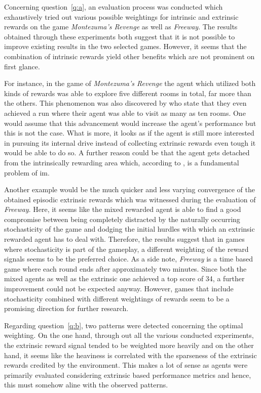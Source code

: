 \documentclass[draft,final]{vutinfth} %
\begin{document}
    Concerning question~\ref{q:a}, an evaluation process was conducted which exhaustively tried out various possible weightings for intrinsic and extrinsic rewards on the game \textit{Montezuma's Revenge} as well as \textit{Freeway}.
    The results obtained through these experiments both suggest that it is not possible to improve existing results in the two selected games.
    However, it seems that the combination of intrinsic rewards yield other benefits which are not prominent on first glance.

    For instance, in the game of \textit{Montezuma's Revenge} the agent which utilized both kinds of rewards was able to explore five different rooms in total, far more than the others.
    This phenomenon was also discovered by \citeauthor{burda_large-scale_2018-1} who state that they even achieved a run where their agent was able to visit as many as ten rooms.
    One would assume that this advancement would increase the agent's performance but this is not the case.
    What is more, it looks as if the agent is still more interested in pursuing its internal drive instead of collecting extrinsic rewards even tough it would be able to do so.
    A further reason could be that the agent gets detached from the intrinsically rewarding area which, according to \citet{ecoffet_go-explore_2019}, is a fundamental problem of \gls{im}.

    Another example would be the much quicker and less varying convergence of the obtained episodic extrinsic rewards which was witnessed during the evaluation of \textit{Freeway}.
    Here, it seems like the mixed rewarded agent is able to find a good compromise between being completely distracted by the naturally occurring stochasticity of the game and dodging the initial hurdles with which an extrinsic rewarded agent has to deal with.
    Therefore, the results suggest that in games where stochasticity is part of the gameplay, a different weighting of the reward signals seems to be the preferred choice.
    As a side note, \textit{Freeway} is a time based game where each round ends after approximately two minutes.
    Since both the mixed agents as well as the extrinsic one achieved a top score of 34, a further improvement could not be expected anyway.
    However, games that include stochasticity combined with different weightings of rewards seem to be a promising direction for further research.

    Regarding question~\ref{q:b}, two patterns were detected concerning the optimal weighting.
    On the one hand, through out all the various conducted experiments, the extrinsic reward signal tended to be weighted more heavily and on the other hand, it seems like the heaviness is correlated with the sparseness of the extrinsic rewards credited by the environment.
    This makes a lot of sense as agents were primarily evaluated considering extrinsic based performance metrics and hence, this must somehow aline with the observed patterns.
\end{document}
